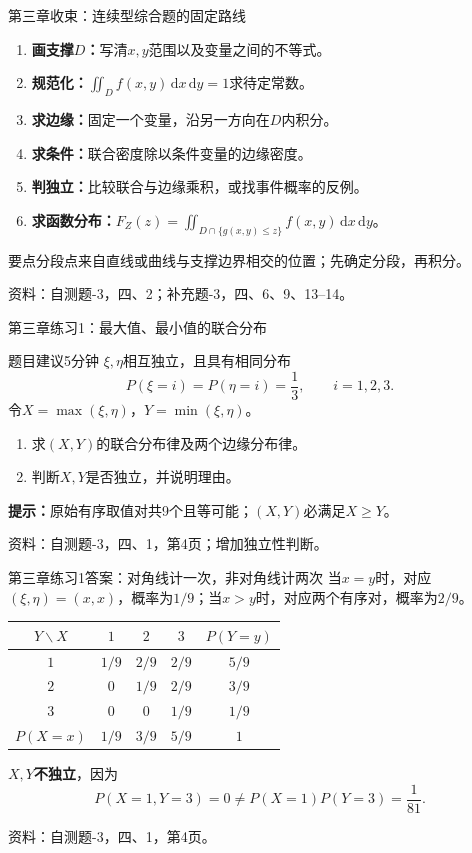 \documentclass[aspectratio=169,10pt]{beamer}
\newcommand{\dd}{\,\mathrm{d}}
\newcommand{\source}[1]{\vfill{\color{Muted}\fontsize{6.5}{8}\selectfont 资料：#1\par}}
\newcommand{\key}[1]{\begin{block}{要点}#1\end{block}}
\begin{document}
\begin{frame}[t]{第三章收束：连续型综合题的固定路线}
\begin{enumerate}
\item \textbf{画支撑$D$：}写清$x,y$范围以及变量之间的不等式。
\item \textbf{规范化：}$\iint_D f(x,y)\dd x\dd y=1$求待定常数。
\item \textbf{求边缘：}固定一个变量，沿另一方向在$D$内积分。
\item \textbf{求条件：}联合密度除以条件变量的边缘密度。
\item \textbf{判独立：}比较联合与边缘乘积，或找事件概率的反例。
\item \textbf{求函数分布：}$F_Z(z)=\iint_{D\cap\{g(x,y)\le z\}}f(x,y)\dd x\dd y$。
\end{enumerate}
\key{分段点来自直线或曲线与支撑边界相交的位置；先确定分段，再积分。}
\source{自测题-3，四、2；补充题-3，四、6、9、13--14。}
\end{frame}

\begin{frame}[t]{第三章练习1：最大值、最小值的联合分布}
\begin{block}{题目\quad 建议5分钟}
$\xi,\eta$相互独立，且具有相同分布
\[
P(\xi=i)=P(\eta=i)=\frac13,\qquad i=1,2,3.
\]
令$X=\max(\xi,\eta)$，$Y=\min(\xi,\eta)$。
\begin{enumerate}
\item 求$(X,Y)$的联合分布律及两个边缘分布律。
\item 判断$X,Y$是否独立，并说明理由。
\end{enumerate}
\end{block}
\textbf{提示：}原始有序取值对共9个且等可能；$(X,Y)$必满足$X\ge Y$。
\source{自测题-3，四、1，第4页；增加独立性判断。}
\end{frame}

\begin{answerframe}{第三章练习1答案：对角线计一次，非对角线计两次}
当$x=y$时，对应$(\xi,\eta)=(x,x)$，概率为$1/9$；当$x>y$时，对应两个有序对，概率为$2/9$。
\renewcommand{\arraystretch}{1.4}
\begin{center}
\begin{tabular}{c|ccc|c}
\toprule
$Y\backslash X$ & $1$ & $2$ & $3$ & $P(Y=y)$\\\midrule
$1$ & $1/9$ & $2/9$ & $2/9$ & $5/9$\\
$2$ & $0$ & $1/9$ & $2/9$ & $3/9$\\
$3$ & $0$ & $0$ & $1/9$ & $1/9$\\\midrule
$P(X=x)$ & $1/9$ & $3/9$ & $5/9$ & $1$\\\bottomrule
\end{tabular}
\end{center}
$X,Y$\textbf{不独立}，因为
\[
P(X=1,Y=3)=0\ne P(X=1)P(Y=3)=\frac1{81}.
\]
\source{自测题-3，四、1，第4页。}
\end{answerframe}
\end{document}
